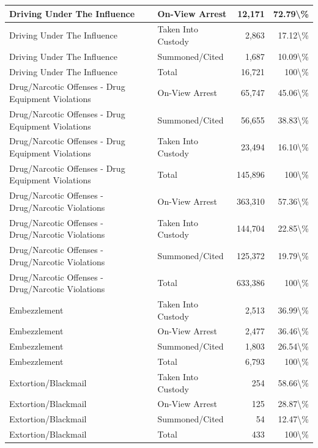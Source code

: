 \documentclass[
]{krantz}
\begin{document}
\begin{longtable}[t]{l|l|r|r}
Driving Under The Influence & On-View Arrest & 12,171 & 72.79\textbackslash{}\%\\
\hline
Driving Under The Influence & Taken Into Custody & 2,863 & 17.12\textbackslash{}\%\\
\hline
Driving Under The Influence & Summoned/Cited & 1,687 & 10.09\textbackslash{}\%\\
\hline
Driving Under The Influence & Total & 16,721 & 100\textbackslash{}\%\\
\hline
Drug/Narcotic Offenses - Drug Equipment Violations & On-View Arrest & 65,747 & 45.06\textbackslash{}\%\\
\hline
Drug/Narcotic Offenses - Drug Equipment Violations & Summoned/Cited & 56,655 & 38.83\textbackslash{}\%\\
\hline
Drug/Narcotic Offenses - Drug Equipment Violations & Taken Into Custody & 23,494 & 16.10\textbackslash{}\%\\
\hline
Drug/Narcotic Offenses - Drug Equipment Violations & Total & 145,896 & 100\textbackslash{}\%\\
\hline
Drug/Narcotic Offenses - Drug/Narcotic Violations & On-View Arrest & 363,310 & 57.36\textbackslash{}\%\\
\hline
Drug/Narcotic Offenses - Drug/Narcotic Violations & Taken Into Custody & 144,704 & 22.85\textbackslash{}\%\\
\hline
Drug/Narcotic Offenses - Drug/Narcotic Violations & Summoned/Cited & 125,372 & 19.79\textbackslash{}\%\\
\hline
Drug/Narcotic Offenses - Drug/Narcotic Violations & Total & 633,386 & 100\textbackslash{}\%\\
\hline
Embezzlement & Taken Into Custody & 2,513 & 36.99\textbackslash{}\%\\
\hline
Embezzlement & On-View Arrest & 2,477 & 36.46\textbackslash{}\%\\
\hline
Embezzlement & Summoned/Cited & 1,803 & 26.54\textbackslash{}\%\\
\hline
Embezzlement & Total & 6,793 & 100\textbackslash{}\%\\
\hline
Extortion/Blackmail & Taken Into Custody & 254 & 58.66\textbackslash{}\%\\
\hline
Extortion/Blackmail & On-View Arrest & 125 & 28.87\textbackslash{}\%\\
\hline
Extortion/Blackmail & Summoned/Cited & 54 & 12.47\textbackslash{}\%\\
\hline
Extortion/Blackmail & Total & 433 & 100\textbackslash{}\%\\

\end{longtable}
\end{document}
